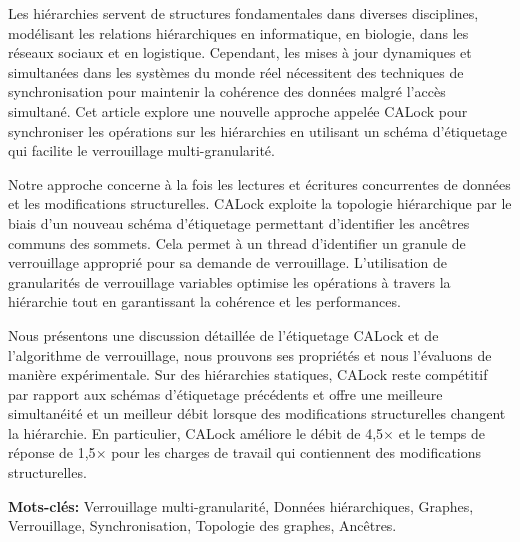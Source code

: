 %
\label{chap:résumé}

\vspace*{8mm}
Les hiérarchies servent de structures fondamentales dans diverses disciplines, modélisant les relations hiérarchiques en informatique, en biologie, dans les réseaux sociaux et en logistique. Cependant, les mises à jour dynamiques et simultanées dans les systèmes du monde réel nécessitent des techniques de synchronisation pour maintenir la cohérence des données malgré l'accès simultané. Cet article explore une nouvelle approche appelée CALock pour synchroniser les opérations sur les hiérarchies en utilisant un schéma d'étiquetage qui facilite le verrouillage multi-granularité.

Notre approche concerne à la fois les lectures et écritures concurrentes de données et les modifications structurelles. CALock exploite la topologie hiérarchique par le biais d'un nouveau schéma d'étiquetage permettant d'identifier les ancêtres communs des sommets. Cela permet à un thread d'identifier un granule de verrouillage approprié pour sa demande de verrouillage. L'utilisation de granularités de verrouillage variables optimise les opérations à travers la hiérarchie tout en garantissant la cohérence et les performances.

Nous présentons une discussion détaillée de l'étiquetage CALock et de l'algorithme de verrouillage, nous prouvons ses propriétés et nous l'évaluons de manière expérimentale. Sur des hiérarchies statiques, CALock reste compétitif par rapport aux schémas d'étiquetage précédents et offre une meilleure simultanéité et un meilleur débit lorsque des modifications structurelles changent la hiérarchie. En particulier, CALock améliore le débit de 4,5$\times$ et le temps de réponse de 1,5$\times$ pour les charges de travail qui contiennent des modifications structurelles.

\textbf{Mots-clés:} 
Verrouillage multi-granularité, Données hiérarchiques, Graphes, Verrouillage, Synchronisation, Topologie des graphes, Ancêtres. 